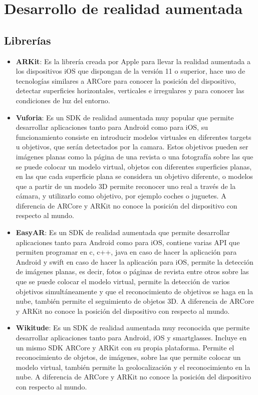 \section{Desarrollo de realidad aumentada}

\subsection{Librerías}
\begin{itemize}
  \item \textbf{ARKit}: Es la librería creada por Apple para llevar la realidad aumentada a los dispositivos iOS que dispongan de la versión 11 o superior, hace uso de tecnologías similares a ARCore para conocer la posición del dispositivo, detectar superficies horizontales, verticales e irregulares y para conocer las condiciones de luz del entorno. \cite{arkit}

  \item \textbf{Vuforia}: Es un SDK de realidad aumentada muy popular que permite desarrollar aplicaciones tanto para Android como para iOS, su funcionamiento consiste en introducir modelos virtuales en diferentes targets u objetivos, que serán detectados por la camara. Estos objetivos pueden ser imágenes planas como la página de una revista o una fotografía sobre las que se puede colocar un modelo virtual, objetos con diferentes superficies planas, en las que cada superficie plana se considera un objetivo diferente, o modelos que a partir de un modelo 3D permite reconocer uno real a través de la cámara, y utilizarlo como objetivo, por ejemplo coches o juguetes. A diferencia de ARCore y ARKit no conoce la posición del dispositivo con respecto al mundo. \cite{vuforia}

  \item \textbf{EasyAR}: Es un SDK de realidad aumentada que permite desarrollar aplicaciones tanto para Android como para iOS, contiene varias API que permiten programar en c, c++, java en caso de hacer la aplicación para Android y swift en caso de hacer la aplicación para iOS, permite la detección de imágenes planas, es decir, fotos o páginas de revista entre otros sobre las que se puede colocar el modelo virtual, permite la detección de varios objetivos simultáneamente y que el reconocimiento de objetivos se haga en la nube, también permite el seguimiento de objetos 3D. A diferencia de ARCore y ARKit no conoce la posición del dispositivo con respecto al mundo. \cite{easyar}

  \item \textbf{Wikitude}: Es un SDK de realidad aumentada muy reconocida que permite desarrollar aplicaciones tanto para Android, iOS y smartglasses. Incluye en un mismo SDK ARCore y ARKit con su propia plataforma. Permite el reconocimiento de objetos, de imágenes, sobre las que permite colocar un modelo virtual, también permite la geolocalización y el reconocimiento en la nube. A diferencia de ARCore y ARKit no conoce la posición del dispositivo con respecto al mundo. \cite{wikitude}
\end{itemize}


